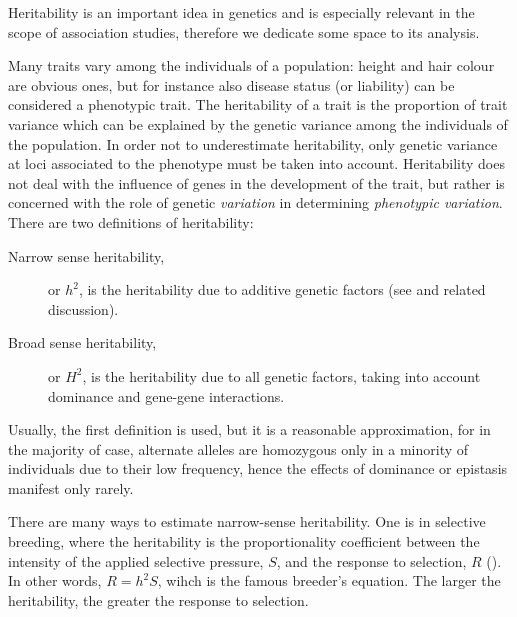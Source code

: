 \documentclass[../main.tex]{subfiles}
\begin{document}
Heritability is an important idea in genetics and is especially relevant 
in the scope of association studies, therefore we dedicate some space to 
its analysis.

Many traits vary among the individuals of a population: height and hair 
colour are obvious ones, but for instance also disease status (or 
liability) can be considered a phenotypic trait. The heritability of a 
trait is the proportion of trait variance which can be explained by the 
genetic variance among the individuals of the population. In order not 
to underestimate heritability, only genetic variance at loci associated 
to the phenotype must be taken into account. 
Heritability does not deal with the influence of genes in the 
development of the trait, but rather is concerned with the role of 
genetic \textit{variation} in determining \textit{phenotypic variation}. 
There are two definitions of heritability:

\begin{description}
	\item[Narrow sense heritability,] or $h^2$, is the heritability due 
to additive genetic factors (see  and related 
discussion).
	\item[Broad sense heritability,] or $H^2$, is the heritability due 
to all genetic factors, taking into account dominance and gene-gene 
interactions.
\end{description}


Usually, the first definition is used, but it is a reasonable 
approximation, for in the majority of case, alternate alleles are 
homozygous only in a minority of individuals due to their low frequency, 
hence the effects of dominance or epistasis manifest only 
rarely\cite{Visscher2008march}.

There are many ways to estimate narrow-sense heritability. One is in 
selective breeding, where the heritability is the proportionality 
coefficient between the intensity of the applied selective pressure, 
$S$, and the response to selection, $R$ (). In other 
words, $R = h^2 S$, wihch is the famous breeder's equation. The larger 
the heritability, the greater the response to selection.
\end{document}
